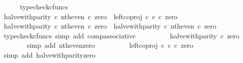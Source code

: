 \begin{isabellebody}
\ \ \ \ \isamarkupfalse%
\ typecheck{\isacharunderscore}{\kern0pt}cfuncs\isanewline
\isanewline
\ \ \isamarkupfalse%
\ {\isachardoublequoteopen}{\isacharparenleft}{\kern0pt}halve{\isacharunderscore}{\kern0pt}with{\isacharunderscore}{\kern0pt}parity\ {\isasymcirc}\isactrlsub c\ nth{\isacharunderscore}{\kern0pt}even{\isacharparenright}{\kern0pt}\ {\isasymcirc}\isactrlsub c\ zero\ {\isacharequal}{\kern0pt}\ left{\isacharunderscore}{\kern0pt}coproj\ {\isasymnat}\isactrlsub c\ {\isasymnat}\isactrlsub c\ {\isasymcirc}\isactrlsub c\ zero{\isachardoublequoteclose}\isanewline
\ \ \isamarkupfalse%
\ {\isacharminus}{\kern0pt}\isanewline
\ \ \ \ \isamarkupfalse%
\ {\isachardoublequoteopen}{\isacharparenleft}{\kern0pt}halve{\isacharunderscore}{\kern0pt}with{\isacharunderscore}{\kern0pt}parity\ {\isasymcirc}\isactrlsub c\ nth{\isacharunderscore}{\kern0pt}even{\isacharparenright}{\kern0pt}\ {\isasymcirc}\isactrlsub c\ zero\ {\isacharequal}{\kern0pt}\ halve{\isacharunderscore}{\kern0pt}with{\isacharunderscore}{\kern0pt}parity\ {\isasymcirc}\isactrlsub c\ nth{\isacharunderscore}{\kern0pt}even\ {\isasymcirc}\isactrlsub c\ zero{\isachardoublequoteclose}\isanewline
\ \ \ \ \ \ \isamarkupfalse%
\ {\isacharparenleft}{\kern0pt}typecheck{\isacharunderscore}{\kern0pt}cfuncs{\isacharcomma}{\kern0pt}\ simp\ add{\isacharcolon}{\kern0pt}\ comp{\isacharunderscore}{\kern0pt}associative{}{\isacharparenright}{\kern0pt}\isanewline
\ \ \ \ \isamarkupfalse%
\ \isamarkupfalse%
\ {\isachardoublequoteopen}{\isachardot}{\kern0pt}{\isachardot}{\kern0pt}{\isachardot}{\kern0pt}\ {\isacharequal}{\kern0pt}\ halve{\isacharunderscore}{\kern0pt}with{\isacharunderscore}{\kern0pt}parity\ {\isasymcirc}\isactrlsub c\ zero{\isachardoublequoteclose}\isanewline
\ \ \ \ \ \ \isamarkupfalse%
\ {\isacharparenleft}{\kern0pt}simp\ add{\isacharcolon}{\kern0pt}\ nth{\isacharunderscore}{\kern0pt}even{\isacharunderscore}{\kern0pt}zero{\isacharparenright}{\kern0pt}\isanewline
\ \ \ \ \isamarkupfalse%
\ \isamarkupfalse%
\ {\isachardoublequoteopen}{\isachardot}{\kern0pt}{\isachardot}{\kern0pt}{\isachardot}{\kern0pt}\ {\isacharequal}{\kern0pt}\ left{\isacharunderscore}{\kern0pt}coproj\ {\isasymnat}\isactrlsub c\ {\isasymnat}\isactrlsub c\ {\isasymcirc}\isactrlsub c\ zero{\isachardoublequoteclose}\isanewline
\ \ \ \ \ \ \isamarkupfalse%
\ {\isacharparenleft}{\kern0pt}simp\ add{\isacharcolon}{\kern0pt}\ halve{\isacharunderscore}{\kern0pt}with{\isacharunderscore}{\kern0pt}parity{\isacharunderscore}{\kern0pt}zero{\isacharparenright}{\kern0pt}\isanewline

\end{isabellebody}

